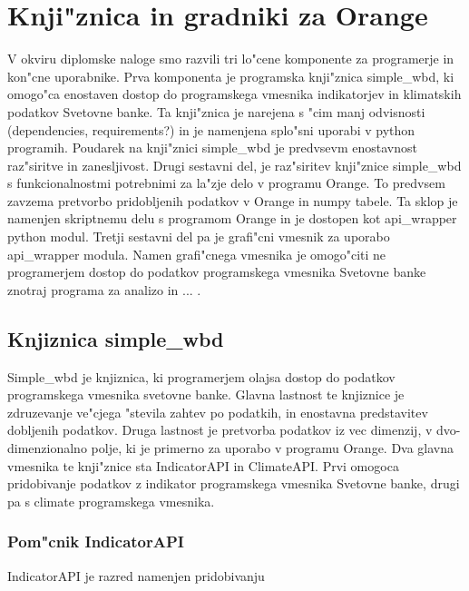 \chapter{Knji"znica in gradniki za Orange}

V okviru diplomske naloge smo razvili tri lo"cene komponente za programerje in
kon"cne uporabnike. Prva komponenta je programska knji"znica simple\_wbd, ki
omogo"ca enostaven dostop do programskega vmesnika indikatorjev in klimatskih
podatkov Svetovne banke. Ta knji"znica je narejena s "cim manj odvisnosti
(dependencies, requirements?) in je namenjena splo"sni uporabi v python
programih. Poudarek na knji"znici simple\_wbd je predvsevm enostavnost 
raz"siritve in zanesljivost. Drugi sestavni del, je raz"siritev knji"znice
simple\_wbd s funkcionalnostmi potrebnimi za la"zje delo v programu Orange.
To predvsem zavzema pretvorbo pridobljenih podatkov v Orange in numpy tabele.
Ta sklop je namenjen skriptnemu delu s programom Orange in je dostopen kot
api\_wrapper python modul. Tretji sestavni del pa je grafi"cni vmesnik za
uporabo api\_wrapper modula. Namen grafi"cnega vmesnika je omogo"citi ne
programerjem dostop do podatkov programskega vmesnika Svetovne banke znotraj
programa za analizo in ... .

\section{Knjiznica simple\_wbd}

Simple\_wbd je knjiznica, ki programerjem olajsa dostop do podatkov
programskega vmesnika svetovne banke. Glavna lastnost te knjiznice je
zdruzevanje ve"cjega "stevila zahtev po podatkih, in enostavna predstavitev
dobljenih podatkov. Druga lastnost je pretvorba podatkov iz vec dimenzij, v
dvo-dimenzionalno polje, ki je primerno za uporabo v programu Orange. Dva
glavna vmesnika te knji"znice sta IndicatorAPI in ClimateAPI. Prvi omogoca
pridobivanje podatkov z indikator programskega vmesnika Svetovne banke, drugi
pa s climate programskega vmesnika.




% 



\subsection{Pom"cnik IndicatorAPI}

IndicatorAPI je razred namenjen pridobivanju 



